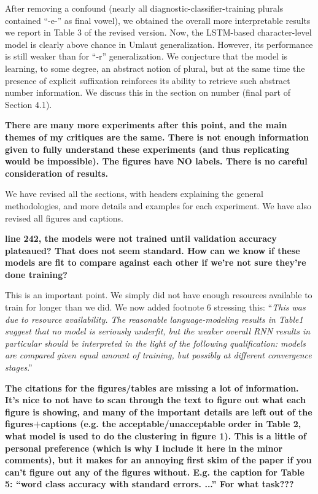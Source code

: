 \documentclass{article}[11pt,a4paper,oneside]
\begin{document}
{After removing a confound (nearly all diagnostic-classifier-training plurals contained ``-e-'' as final vowel), we obtained the overall more interpretable results we report in Table 3 of the revised version. Now, the LSTM-based character-level model is clearly above chance in Umlaut generalization. However, its performance is still weaker than for ``-r'' generalization. We conjecture that the model is learning, to some degree, an abstract notion of plural, but at the same time the presence of explicit suffixation reinforces its ability to retrieve such abstract number information. We discuss this in the section on number (final part of Section 4.1).
\newline

\textbf{There are many more experiments after this point, and the main themes of my critiques are the same.  There is not enough information given to fully understand these experiments (and thus replicating would be impossible). The figures have NO labels.  There is no careful consideration of results.}

We have revised all the sections, with headers explaining the general methodologies, and more details and examples for each experiment. We have also revised all figures and captions.
\newline

\textbf{line 242, the models were not trained until validation accuracy plateaued? That does not seem standard.  How can we know if these models are fit to compare against each other if we're not sure they're done training?}

This is an important point. We simply did not have enough resources available to train for longer than we did. We now added footnote 6 stressing this: ``\textit{This was due to resource availability. The reasonable language-modeling results in Table1 suggest that no model is seriously underfit, but the weaker overall RNN results in particular should be interpreted in the light of the following qualification:  models are compared} \emph{given equal amount of training, but possibly at different convergence stages}.''
\newline

\textbf{The citations for the figures/tables are missing a lot of information.  It's nice to not have to scan through the text to figure out what each figure is showing, and many of the important details are left out of the figures+captions (e.g. the acceptable/unacceptable order in Table 2, what model is used to do the clustering in figure 1).  This is a little of personal preference (which is why I include it here in the minor comments), but it makes for an annoying first skim of the paper if you can't figure out any of the figures without.  E.g. the caption for Table 5: ``word class accuracy with standard errors. ...''  For what task???}

}
\end{document}
